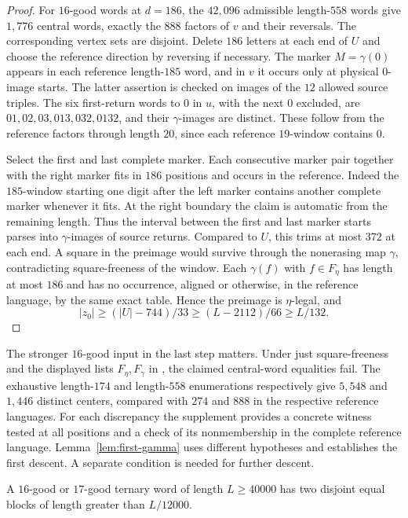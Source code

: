 \begin{proof}
For \(16\)-good words at \(d=186\), the \(42{,}096\) admissible length-\(558\) words give \(1{,}776\) central words, exactly the \(888\) factors of \(v\) and their reversals. The corresponding vertex sets are disjoint. Delete \(186\) letters at each end of \(U\) and choose the reference direction by reversing if necessary. The marker \(M=\gamma(0)\) appears in each reference length-\(185\) word, and in \(v\) it occurs only at physical \(0\)-image starts. The latter assertion is checked on images of the \(12\) allowed source triples. The six first-return words to \(0\) in \(u\), with the next \(0\) excluded, are \(01,02,03,013,032,0132\), and their \(\gamma\)-images are distinct. These follow from the reference factors through length \(20\), since each reference \(19\)-window contains \(0\).

Select the first and last complete marker. Each consecutive marker pair together with the right marker fits in \(186\) positions and occurs in the reference. Indeed the \(185\)-window starting one digit after the left marker contains another complete marker whenever it fits. At the right boundary the claim is automatic from the remaining length. Thus the interval between the first and last marker starts parses into \(\gamma\)-images of source returns. Compared to \(U\), this trims at most \(372\) at each end. A square in the preimage would survive through the nonerasing map \(\gamma\), contradicting square-freeness of the window. Each \(\gamma(f)\) with \(f\in F_\eta\) has length at most \(186\) and has no occurrence, aligned or otherwise, in the reference language, by the same exact table. Hence the preimage is \(\eta\)-legal, and
\[
              |z_0|\ge (|U|-744)/33\ge(L-2112)/66\ge L/132 .
\]
\end{proof}

The stronger \(16\)-good input in the last step matters. Under just square-freeness and the displayed lists \(F_\eta,F_\gamma\) in \cite[Lemmas~6--7]{DMO}, the claimed central-word equalities fail. The exhaustive length-\(174\) and length-\(558\) enumerations respectively give \(5{,}548\) and \(1{,}446\) distinct centers, compared with \(274\) and \(888\) in the respective reference languages. For each discrepancy the supplement provides a concrete witness tested at all positions and a check of its nonmembership in the complete reference language. Lemma~\ref{lem:first-gamma} uses different hypotheses and establishes the first descent. A separate condition is needed for further descent.

\begin{theorem}\label{thm:ternary-linear-match}
A \(16\)-good or \(17\)-good ternary word of length \(L\ge40000\) has two disjoint equal blocks of length greater than \(L/12000\).
\end{theorem}

